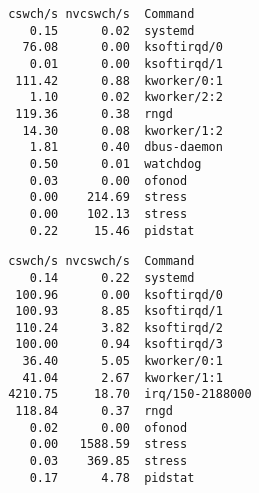 \begin{frame}[containsverbatim]
\begin{verbatim}
 cswch/s nvcswch/s  Command
    0.15      0.02  systemd
   76.08      0.00  ksoftirqd/0
    0.01      0.00  ksoftirqd/1
  111.42      0.88  kworker/0:1
    1.10      0.02  kworker/2:2
  119.36      0.38  rngd
   14.30      0.08  kworker/1:2
    1.81      0.40  dbus-daemon
    0.50      0.01  watchdog
    0.03      0.00  ofonod
    0.00    214.69  stress
    0.00    102.13  stress
    0.22     15.46  pidstat
\end{verbatim}
\end{frame}

\begin{frame}[containsverbatim]
\begin{verbatim}
 cswch/s nvcswch/s  Command
    0.14      0.22  systemd
  100.96      0.00  ksoftirqd/0
  100.93      8.85  ksoftirqd/1
  110.24      3.82  ksoftirqd/2
  100.00      0.94  ksoftirqd/3
   36.40      5.05  kworker/0:1
   41.04      2.67  kworker/1:1
 4210.75     18.70  irq/150-2188000
  118.84      0.37  rngd
    0.02      0.00  ofonod
    0.00   1588.59  stress
    0.03    369.85  stress
    0.17      4.78  pidstat
\end{verbatim}
\end{frame}
\begin{frame}
\end{frame}
